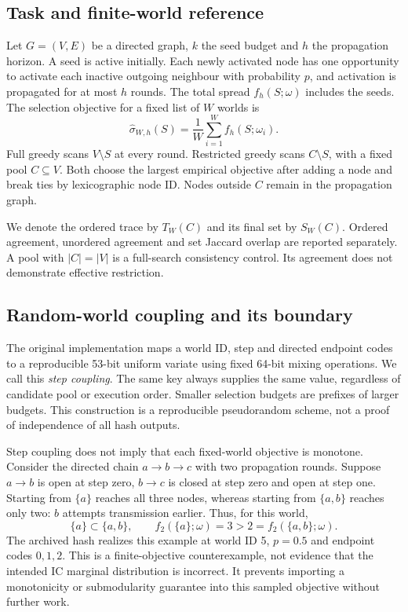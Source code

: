 \subsection{Task and finite-world reference}
Let $G=(V,E)$ be a directed graph, $k$ the seed budget and $h$ the propagation horizon. A seed is active initially. Each newly activated node has one opportunity to activate each inactive outgoing neighbour with probability $p$, and activation is propagated for at most $h$ rounds. The total spread $f_h(S;\omega)$ includes the seeds. The selection objective for a fixed list of $W$ worlds is
\begin{equation}
\widehat\sigma_{W,h}(S)=\frac{1}{W}\sum_{i=1}^{W}f_h(S;\omega_i).
\end{equation}
Full greedy scans $V\setminus S$ at every round. Restricted greedy scans $C\setminus S$, with a fixed pool $C\subseteq V$. Both choose the largest empirical objective after adding a node and break ties by lexicographic node ID. Nodes outside $C$ remain in the propagation graph.

We denote the ordered trace by $T_W(C)$ and its final set by $S_W(C)$. Ordered agreement, unordered agreement and set Jaccard overlap are reported separately. A pool with $|C|=|V|$ is a full-search consistency control. Its agreement does not demonstrate effective restriction.

\subsection{Random-world coupling and its boundary}\label{sec:coupling}
The original implementation maps a world ID, step and directed endpoint codes to a reproducible 53-bit uniform variate using fixed 64-bit mixing operations. We call this \emph{step coupling}. The same key always supplies the same value, regardless of candidate pool or execution order. Smaller selection budgets are prefixes of larger budgets. This construction is a reproducible pseudorandom scheme, not a proof of independence of all hash outputs.

Step coupling does not imply that each fixed-world objective is monotone. Consider the directed chain $a\rightarrow b\rightarrow c$ with two propagation rounds. Suppose $a\rightarrow b$ is open at step zero, $b\rightarrow c$ is closed at step zero and open at step one. Starting from $\{a\}$ reaches all three nodes, whereas starting from $\{a,b\}$ reaches only two: $b$ attempts transmission earlier. Thus, for this world,
\begin{equation}
\{a\}\subset\{a,b\},\qquad f_2(\{a\};\omega)=3>2=f_2(\{a,b\};\omega).
\end{equation}
The archived hash realizes this example at world ID 5, $p=0.5$ and endpoint codes $0,1,2$. This is a finite-objective counterexample, not evidence that the intended IC marginal distribution is incorrect. It prevents importing a monotonicity or submodularity guarantee into this sampled objective without further work.

